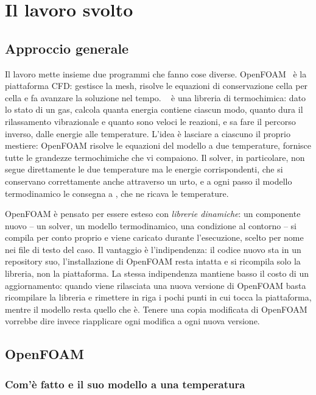 \section{Il lavoro svolto}
\label{sec:lavoro}

\subsection{Approccio generale}
\label{sec:approccio}

Il lavoro mette insieme due programmi che fanno cose diverse.
OpenFOAM~\cite{openfoam13} è la piattaforma CFD: gestisce la mesh, risolve le
equazioni di conservazione cella per cella e fa avanzare la soluzione nel
tempo. \mpp~\cite{scoggins2020} è una libreria di termochimica: dato lo stato
di un gas, calcola quanta energia contiene ciascun modo, quanto dura il
rilassamento vibrazionale e quanto sono veloci le reazioni, e sa fare il
percorso inverso, dalle energie alle temperature. L'idea è lasciare a ciascuno
il proprio mestiere: OpenFOAM risolve le equazioni del modello a due
temperature, \mpp{} fornisce tutte le grandezze termochimiche che vi
compaiono. Il solver, in particolare, non segue direttamente le due
temperature ma le energie corrispondenti, che si conservano correttamente anche
attraverso un urto, e a ogni passo il modello termodinamico le consegna a
\mpp, che ne ricava le temperature.

OpenFOAM è pensato per essere esteso con \emph{librerie dinamiche}: un
componente nuovo -- un solver, un modello termodinamico, una condizione al
contorno -- si compila per conto proprio e viene caricato durante
l'esecuzione, scelto per nome nei file di testo del caso. Il vantaggio è
l'indipendenza: il codice nuovo sta in un repository suo, l'installazione di
OpenFOAM resta intatta e si ricompila solo la libreria, non la piattaforma.
La stessa indipendenza mantiene basso il costo di un
aggiornamento: quando viene rilasciata una nuova versione di OpenFOAM basta ricompilare
la libreria e rimettere in riga i pochi punti in cui tocca la piattaforma,
mentre il modello resta quello che è. Tenere una copia modificata di OpenFOAM
vorrebbe dire invece riapplicare ogni modifica a ogni nuova versione.

\subsection{OpenFOAM}
\label{sec:openfoam}

\subsubsection{Com'è fatto e il suo modello a una temperatura}
\label{sec:openfoam-moduli}

